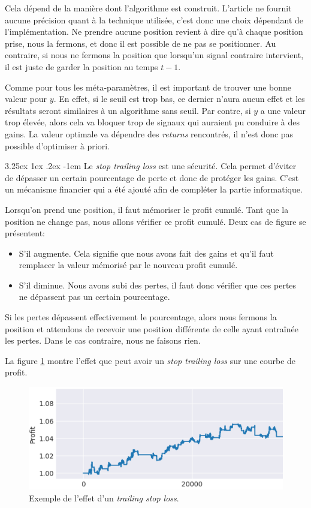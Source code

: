 \documentclass[a4paper, 11pt]{article}
\makeatletter
\renewcommand\paragraph{\@startsection{paragraph}{5}{\z@}%
  {3.25ex \@plus1ex \@minus.2ex}%
  {-1em}%
  {\normalfont\normalsize\bfseries}}
\makeatother
\begin{document}
Cela dépend de la manière dont l'algorithme est construit. L'article ne fournit aucune précision quant à la technique utilisée, c'est donc une choix
dépendant de l'implémentation. Ne prendre aucune position revient à dire qu'à chaque position prise, nous la fermons, et donc il est possible de ne pas
se positionner. Au contraire, si nous ne fermons la position que lorsqu'un signal contraire intervient, il est juste de garder la position au temps $t-1$.

Comme pour tous les méta-paramètres, il est important de trouver une bonne valeur pour $y$. En effet, si le seuil est trop bas, ce dernier n'aura aucun effet 
et les résultats seront similaires à un algorithme sans seuil. Par contre, si $y$ a une valeur trop élevée, alors cela va bloquer trop de signaux qui
auraient pu conduire à des gains. La valeur optimale va dépendre des \textit{returns} rencontrés, il n'est donc pas possible d'optimiser à priori.

\paragraph{}
Le \textit{stop trailing loss} est une sécurité. Cela permet d'éviter de dépasser un certain pourcentage de perte et donc de protéger les gains. C'est un
mécanisme financier qui a été ajouté afin de compléter la partie informatique.

Lorsqu'on prend une position, il faut mémoriser le profit cumulé. Tant que la position ne change pas, nous allons vérifier ce profit cumulé. Deux cas de
figure se présentent:
\begin{itemize}
 \item S'il augmente. Cela signifie que nous avons fait des gains et qu'il faut remplacer la valeur mémorisé par le nouveau profit cumulé.
 \item S'il diminue. Nous avons subi des pertes, il faut donc vérifier que ces pertes ne dépassent pas un certain pourcentage.
\end{itemize}

Si les pertes dépassent effectivement le pourcentage, alors nous fermons la position et attendons de recevoir une position différente de celle ayant
entraînée les pertes. Dans le cas contraire, nous ne faisons rien.

La figure \ref{stop_loss} montre l'effet que peut avoir un \textit{stop trailing loss} sur une courbe de profit.
\begin{figure}[H]
\centering
\includegraphics[scale=0.5]{images/stop_loss}
\caption{Exemple de l'effet d'un \textit{trailing stop loss}.}
\label{stop_loss}
\end{figure}
\end{document}
